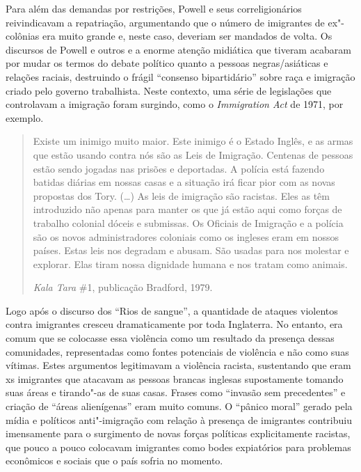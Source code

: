 Para além das demandas por restrições, Powell e seus correligionários reivindicavam a repatriação, argumentando que o número de imigrantes de ex"-colônias era muito grande e, neste caso, deveriam ser mandados de volta. Os discursos de Powell e outros e a enorme atenção midiática que tiveram acabaram por mudar os termos do debate político quanto a pessoas negras/asiáticas e relações raciais, destruindo o frágil ``consenso bipartidário'' sobre raça e imigração criado pelo governo trabalhista. Neste contexto, uma série de legislações que controlavam a imigração foram surgindo, como o \emph{Immigration Act} de 1971, por exemplo.

\begin{quote}
Existe um inimigo muito maior. Este inimigo é o Estado Inglês, e as armas que estão usando contra nós são as Leis de Imigração. Centenas de pessoas estão sendo jogadas nas prisões e deportadas. A polícia está fazendo batidas diárias em nossas casas e a situação irá ficar pior com as novas propostas dos Tory. (\ldots{}) As leis de imigração são racistas. Eles as têm introduzido não apenas para manter os que já estão aqui como forças de trabalho colonial dóceis e submissas. Os Oficiais de Imigração e a polícia são os novos administradores coloniais como os ingleses eram em nossos países. Estas leis nos degradam e abusam. São usadas para nos molestar e explorar. Elas tiram nossa dignidade humana e nos tratam como animais.

\emph{Kala Tara} \#1, publicação  Bradford, 1979.
\end{quote}

Logo após o discurso dos ``Rios de sangue'', a quantidade de ataques violentos contra imigrantes cresceu dramaticamente por toda Inglaterra. No entanto, era comum que se colocasse essa violência como um resultado da presença dessas comunidades, representadas como fontes potenciais de violência e não como suas vítimas. Estes argumentos legitimavam a violência racista, sustentando que eram xs imigrantes que atacavam as pessoas brancas inglesas supostamente tomando suas áreas e tirando"-as de suas casas. Frases como ``invasão sem precedentes'' e criação de ``áreas alienígenas'' eram muito comuns. O ``pânico moral'' gerado pela mídia e políticos anti"-imigração com relação à presença de imigrantes contribuiu imensamente para o surgimento de novas forças políticas explicitamente racistas, que pouco a pouco colocavam imigrantes como bodes expiatórios para problemas econômicos e sociais que o país sofria no momento.

